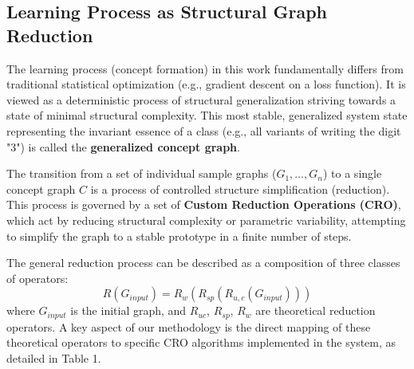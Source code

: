 \documentclass[conference]{IEEEtran}
\begin{document}
\subsection{Learning Process as Structural Graph Reduction}
The learning process (concept formation) in this work fundamentally differs from traditional statistical optimization (e.g., gradient descent on a loss function). It is viewed as a deterministic process of structural generalization striving towards a state of minimal structural complexity. This most stable, generalized system state representing the invariant essence of a class (e.g., all variants of writing the digit "3") is called the \textbf{generalized concept graph}.

The transition from a set of individual sample graphs ($G_1, \dots, G_n$) to a single concept graph $C$ is a process of controlled structure simplification (reduction). This process is governed by a set of \textbf{Custom Reduction Operations (CRO)}, which act by reducing structural complexity or parametric variability, attempting to simplify the graph to a stable prototype in a finite number of steps.

The general reduction process can be described as a composition of three classes of operators: 
\[
R(G_{input}) = R_w(R_{sp}(R_{u,c}(G_{input})))
\]
where $G_{input}$ is the initial graph, and $R_{uc}$, $R_{sp}$, $R_w$ are theoretical reduction operators. A key aspect of our methodology is the direct mapping of these theoretical operators to specific CRO algorithms implemented in the system, as detailed in Table 1.
\end{document}
